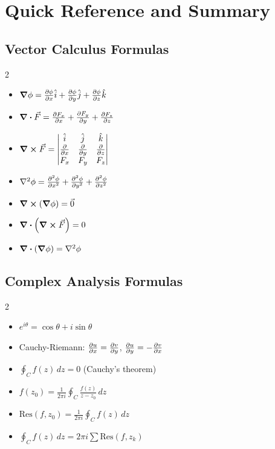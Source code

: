 \documentclass[12pt,a4paper]{article}
\begin{document}
\newpage

\section{Quick Reference and Summary}

\subsection{Vector Calculus Formulas}
\begin{multicols}{2}
\begin{itemize}
    \item $\grad\phi = \pdv{\phi}{x}\hat{i} + \pdv{\phi}{y}\hat{j} + \pdv{\phi}{z}\hat{k}$
    \item $\div\vec{F} = \pdv{F_x}{x} + \pdv{F_y}{y} + \pdv{F_z}{z}$
    \item $\curl\vec{F} = \begin{vmatrix} \hat{i} & \hat{j} & \hat{k} \\ \pdv{}{x} & \pdv{}{y} & \pdv{}{z} \\ F_x & F_y & F_z \end{vmatrix}$
    \item $\laplacian\phi = \pdv[2]{\phi}{x} + \pdv[2]{\phi}{y} + \pdv[2]{\phi}{z}$
    \item $\curl(\grad\phi) = \vec{0}$
    \item $\div(\curl\vec{F}) = 0$
    \item $\div(\grad\phi) = \laplacian\phi$
\end{itemize}
\end{multicols}

\subsection{Complex Analysis Formulas}
\begin{multicols}{2}
\begin{itemize}
    \item $e^{i\theta} = \cos\theta + i\sin\theta$
    \item Cauchy-Riemann: $\pdv{u}{x} = \pdv{v}{y}$, $\pdv{u}{y} = -\pdv{v}{x}$
    \item $\oint_C f(z) \, dz = 0$ (Cauchy's theorem)
    \item $f(z_0) = \frac{1}{2\pi i}\oint_C \frac{f(z)}{z-z_0} \, dz$
    \item $\text{Res}(f,z_0) = \frac{1}{2\pi i}\oint_C f(z) \, dz$
    \item $\oint_C f(z) \, dz = 2\pi i \sum \text{Res}(f,z_k)$
\end{itemize}
\end{multicols}
\end{document}
